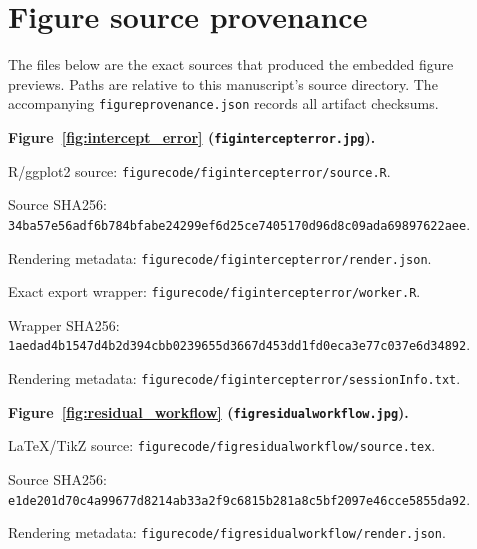 \documentclass[11pt]{article}
\begin{document}
\section*{Figure source provenance}
The files below are the exact sources that produced the embedded figure previews. Paths are relative to this manuscript's source directory. The accompanying \texttt{figureprovenance.json} records all artifact checksums.\par
\medskip\noindent\textbf{Figure~\ref{fig:intercept_error} (\texttt{figintercepterror.jpg}).}\par
\noindent R/ggplot2 source: \texttt{figurecode/\allowbreak{}figintercepterror/\allowbreak{}source.R}.\par
\noindent Source SHA256: \texttt{34ba57e5\allowbreak{}6adf6b78\allowbreak{}4bfabe24\allowbreak{}299ef6d2\allowbreak{}5ce74051\allowbreak{}70d96d8c\allowbreak{}09ada698\allowbreak{}97622aee}.\par
\noindent Rendering metadata: \texttt{figurecode/\allowbreak{}figintercepterror/\allowbreak{}render.json}.\par
\noindent Exact export wrapper: \texttt{figurecode/\allowbreak{}figintercepterror/\allowbreak{}worker.R}.\par
\noindent Wrapper SHA256: \texttt{1aedad4b\allowbreak{}1547d4b2\allowbreak{}d394cbb0\allowbreak{}239655d3\allowbreak{}667d453d\allowbreak{}d1fd0eca\allowbreak{}3e77c037\allowbreak{}e6d34892}.\par
\noindent Rendering metadata: \texttt{figurecode/\allowbreak{}figintercepterror/\allowbreak{}sessionInfo.txt}.\par
\medskip\noindent\textbf{Figure~\ref{fig:residual_workflow} (\texttt{figresidualworkflow.jpg}).}\par
\noindent LaTeX/TikZ source: \texttt{figurecode/\allowbreak{}figresidualworkflow/\allowbreak{}source.tex}.\par
\noindent Source SHA256: \texttt{e1de201d\allowbreak{}70c4a996\allowbreak{}77d8214a\allowbreak{}b33a2f9c\allowbreak{}6815b281\allowbreak{}a8c5bf20\allowbreak{}97e46cce\allowbreak{}5855da92}.\par
\noindent Rendering metadata: \texttt{figurecode/\allowbreak{}figresidualworkflow/\allowbreak{}render.json}.\par
\end{document}
